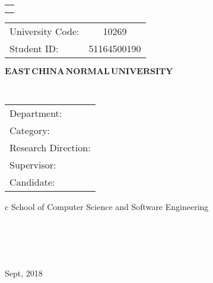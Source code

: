 

\pagestyle{empty}

\begin{flushleft}
	\footnotesize
	\begin{tabular}{l}
		\noindent{ Dissertation for master degree in 2019}  \\ 
		\noindent{  (Professional)}\\ 
	\end{tabular}
\hspace{104pt} 
	\begin{tabular}{lc}
	 University Code:  &  10269  \\ 
 Student ID: &    51164500190  \\ 
	\end{tabular}
\end{flushleft}

\vskip 2cm

\begin{center}
{\Huge $\mathbf{EAST}\,\mathbf{CHINA}\,\mathbf{NORMAL}\,
\mathbf{UNIVERSITY}$}
\end{center}

\vskip 3cm

\begin{center}
\bfseries{\scshape{\huge \TheisNameEn
}}\\
\end{center}

\vskip 3.5cm {\large
\begin{center}
\begin{tabular}{l}
Department:\\
Category:\\ 
Research Direction:\\
Supervisor:\\
Candidate:
\end{tabular}
\begin{tabular}c
\normalsize{{School of Computer Science and Software Engineering}}\\
\hline ~~~  \\
\hline ~~~\\
\hline ~~~ \\
\hline ~~~  \\

\hline
\end{tabular}
\end{center}}

\vskip 30mm

\begin{center}
{\Large Sept, 2018}
\end{center}
